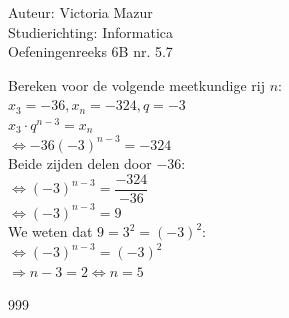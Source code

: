 \documentclass[a4paper]{article}
\begin{document}
  
\noindent \large Auteur: Victoria Mazur \\
\noindent \large Studierichting: Informatica\\
\noindent \large Oefeningenreeks 6B nr. 5.7\\

\medskip

\normalsize

Bereken voor de volgende meetkundige rij $n$: \\

$x_3 = -36, x_n = -324, q = -3$ \\

$x_3 \cdot q^{n-3} = x_n$ \\

$\Leftrightarrow -36(-3)^{n-3} = -324$ \\

Beide zijden delen door $-36$: \\

$\Leftrightarrow (-3)^{n-3} = \dfrac{-324}{-36}$ \\

$\Leftrightarrow (-3)^{n-3} = 9$ \\

We weten dat $9 = 3^2 = (-3)^2$: \\

$\Leftrightarrow (-3)^{n-3} = (-3)^2$ \\

$\Rightarrow n - 3 = 2 \Leftrightarrow n = 5$ \\

\begin{thebibliography}{999}
\end{thebibliography}
\end{document}
